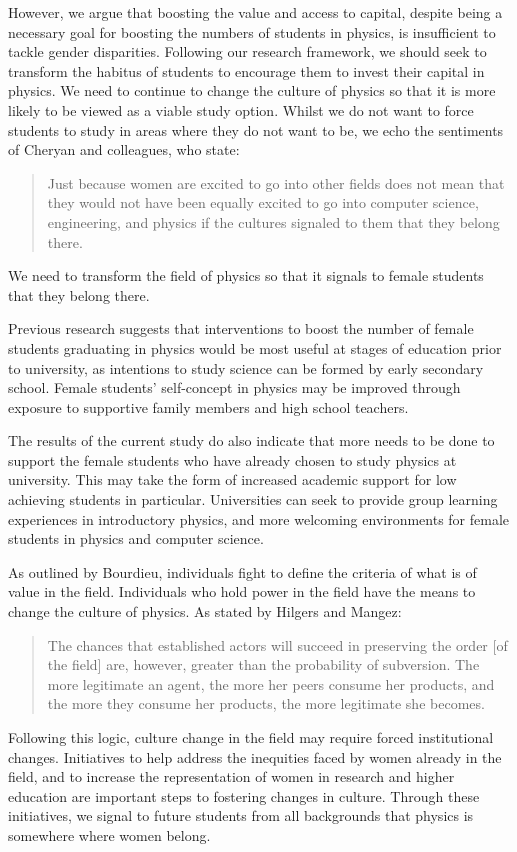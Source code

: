 However, we argue that boosting the value and access to capital, despite being a necessary goal for boosting the numbers of students in physics, is insufficient to tackle gender disparities. Following our research framework, we should seek to transform the habitus of students to encourage them to invest their capital in physics. We need to continue to change the culture of physics so that it is more likely to be viewed as a viable study option. Whilst we do not want to force students to study in areas where they do not want to be, we echo the sentiments of Cheryan and colleagues\cite{cheryan2017some}, who state:
\begin{quote}
Just because women are excited to go into other fields does not mean that they would not have been equally excited to go into computer science, engineering, and physics if the cultures signaled to them that they belong there.
\end{quote} We need to transform the field of physics so that it signals to female students that they belong there. 

Previous research suggests that interventions to boost the number of female students graduating in physics would be most useful at stages of education prior to university\cite{cheryan2017some}, as intentions to study science can be formed by early secondary school.\cite{archer2013aspires,Baram_Tsabari_2010} Female students' self-concept in physics may be improved through exposure to supportive family members\cite{kelly2016social} and high school teachers.\cite{Hazari2017, kelly2016social}

The results of the current study do also indicate that more needs to be done to support the female students who have already chosen to study physics at university. This may take the form of increased academic support for low achieving students in particular. Universities can seek to provide group learning experiences in introductory physics\cite{Sawtelle_2012}, and more welcoming environments for female students in physics and computer science.\cite{master2016computing}

As outlined by Bourdieu, individuals fight to define the criteria of what is of value in the field. Individuals who hold power in the field have the means to change the culture of physics. As stated by Hilgers and Mangez\cite{hilgers2014introduction}:
\begin{quote}
    The chances that established actors will succeed in preserving the order [of the field] are, however, greater than the probability of subversion. The more legitimate an agent, the more her peers consume her products, and the more they consume her products, the more legitimate she becomes.
\end{quote}
Following this logic, culture change in the field may require forced institutional changes. Initiatives to help address the inequities faced by women already in the field\cite{Ivie_2013}, and to increase the representation of women in research and higher education\cite{AthenaSwan,Horizon2020} are important steps to fostering changes in culture. Through these initiatives, we signal to future students from all backgrounds that physics is somewhere where women belong. 

